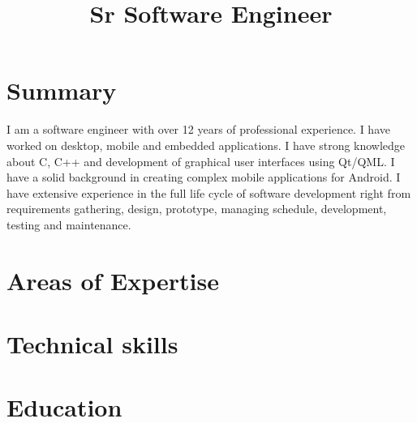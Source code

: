 \documentclass[10pt,a4paper,sans]{moderncv} %
\title{Sr Software Engineer}
\begin{document}
\makecvtitle %


\section{Summary}

I am a software engineer with over 12 years of professional experience. I have worked on desktop, mobile and embedded applications. I have strong knowledge about C, C++ and development of graphical user interfaces using Qt/QML. I have a solid background in creating complex mobile applications for Android. I have extensive experience in the full life cycle of software development right from requirements gathering, design, prototype, managing schedule, development, testing and maintenance.

\section{Areas of Expertise}


\section{Technical skills}


\section{Education}


\end{document}

